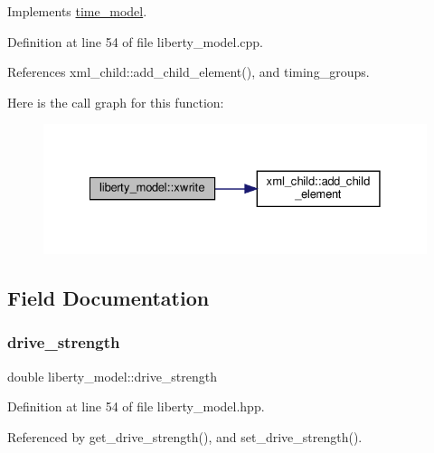 Implements \hyperlink{classtime__model_a6f2a76cabb6407289e757cbdc155260d}{time\+\_\+model}.



Definition at line 54 of file liberty\+\_\+model.\+cpp.



References xml\+\_\+child\+::add\+\_\+child\+\_\+element(), and timing\+\_\+groups.

Here is the call graph for this function\+:
\nopagebreak
\begin{figure}[H]
\begin{center}
\leavevmode
\includegraphics[width=328pt]{d0/dae/classliberty__model_ac02327c2851bea22b94377da3b0b689a_cgraph}
\end{center}
\end{figure}


\subsection{Field Documentation}
\mbox{\label{classliberty__model_ae47f16afa45beaf42e9bc1e377789d2b}} 
\subsubsection{\texorpdfstring{drive\+\_\+strength}{drive\_strength}}
{\footnotesize\ttfamily double liberty\+\_\+model\+::drive\+\_\+strength\hspace{0.3cm}{\ttfamily [private]}}



Definition at line 54 of file liberty\+\_\+model.\+hpp.



Referenced by get\+\_\+drive\+\_\+strength(), and set\+\_\+drive\+\_\+strength().

\mbox{\label{classliberty__model_a5ba9d49f59843f2522156c16fc5a991e}} 
